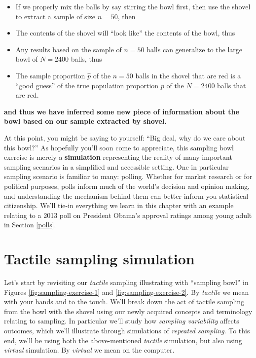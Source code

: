 \documentclass[12pt,]{krantz}
\providecommand{\tightlist}{%
  \setlength{\itemsep}{0pt}\setlength{\parskip}{0pt}}
\renewenvironment{quote}{\begin{VF}}{\end{VF}}
\theoremstyle{definition}
\theoremstyle{definition}
\theoremstyle{definition}
\theoremstyle{remark}
\begin{document}
\begin{quote}
\begin{itemize}
\tightlist
\item
  If we properly mix the balls by say stirring the bowl first, then use
  the shovel to extract a sample of size \(n=50\), then
\item
  The contents of the shovel will ``look like'' the contents of the
  bowl, thus
\item
  Any results based on the sample of \(n=50\) balls can generalize to
  the large bowl of \(N=2400\) balls, thus
\item
  The sample proportion \(\widehat{p}\) of the \(n=50\) balls in the
  shovel that are red is a ``good guess'' of the true population
  proportion \(p\) of the \(N=2400\) balls that are red.
\end{itemize}
\end{quote}

\textbf{and thus we have inferred some new piece of information about
the bowl based on our sample extracted by shovel.}

At this point, you might be saying to yourself: ``Big deal, why do we
care about this bowl?'' As hopefully you'll soon come to appreciate,
this sampling bowl exercise is merely a \textbf{simulation} representing
the reality of many important sampling scenarios in a simplified and
accessible setting. One in particular sampling scenario is familiar to
many: polling. Whether for market research or for political purposes,
polls inform much of the world's decision and opinion making, and
understanding the mechanism behind them can better inform you
statistical citizenship. We'll tie-in everything we learn in this
chapter with an example relating to a 2013 poll on President Obama's
approval ratings among young adult in Section \ref{polls}.

\section{Tactile sampling simulation}\label{tactile}

Let's start by revisiting our \emph{tactile} sampling illustrating with
``sampling bowl'' in Figures \ref{fig:sampling-exercise-1} and
\ref{fig:sampling-exercise-2}. By \emph{tactile} we mean with your hands
and to the touch. We'll break down the act of tactile sampling from the
bowl with the shovel using our newly acquired concepts and terminology
relating to sampling. In particular we'll study how \emph{sampling
variability} affects outcomes, which we'll illustrate through
simulations of \emph{repeated sampling}. To this end, we'll be using
both the above-mentioned \emph{tactile} simulation, but also using
\emph{virtual} simulation. By \emph{virtual} we mean on the computer.
\end{document}
